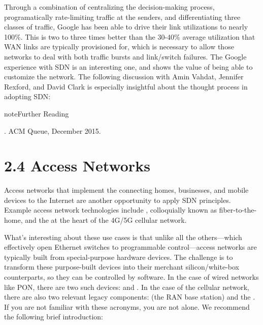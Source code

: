 \documentclass[letterpaper,11pt,english]{sphinxmanual}
\begin{document}
Through a combination of centralizing the decision-making process,
programatically rate-limiting traffic at the senders, and
differentiating three classes of traffic, Google has been able to
drive their link utilizations to nearly 100\%. This is two to three
times better than the 30-40\% average utilization that WAN links are
typically provisioned for, which is necessary to allow those networks
to deal with both traffic bursts and link/switch failures. The Google
experience with SDN is an interesting one, and shows the value of
being able to customize the network. The following discussion with
Amin Vahdat, Jennifer Rexford, and David Clark is especially
insightful about the thought process in adopting SDN:

\label{\detokenize{uses:reading-b4}}
\begin{sphinxadmonition}{note}{Further Reading}

. ACM Queue,
December 2015.
\end{sphinxadmonition}


\section{2.4 Access Networks}
\label{\detokenize{uses:access-networks}}
Access networks that implement the  connecting homes,
businesses, and mobile devices to the Internet are another opportunity
to apply SDN principles. Example access network technologies include
, colloquially known as
fiber-to-the-home, and the  at the heart
of the 4G/5G cellular network.

What’s interesting about these use cases is that unlike all the
others—which effectively open Ethernet switches to programmable
control—access networks are typically built from special-purpose
hardware devices. The challenge is to transform these purpose-built
devices into their merchant silicon/white-box counterparts, so they
can be controlled by software. In the case of wired networks like PON,
there are two such devices:  and
. In the case of the cellular
network, there are also two relevant legacy components:  (the
RAN base station) and the . If you are not
familiar with these acronyms, you are not alone. We recommend the
following brief introduction:
\end{document}
